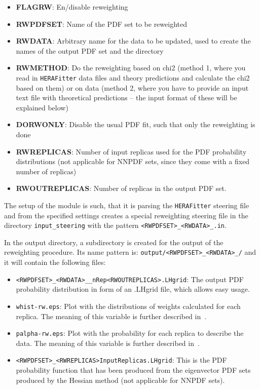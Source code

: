 \documentclass[11pt,a4paper]{article}
\newcommand\fitter{ \mbox{\tt HERAFitter} }
\begin{document}
\begin{itemize}
 \item \textbf{FLAGRW}: En/disable reweighting
 \item \textbf{RWPDFSET}: Name of the PDF set to be reweighted
 \item \textbf{RWDATA}: Arbitrary name for the data to be updated, used to create the names of the output PDF set and the directory
 \item \textbf{RWMETHOD}: Do the reweighting based on chi2 (method 1, where you read in \fitter data files and theory predictions and calculate the chi2 based on them) or on data (method 2, where you have to provide an input text file with theoretical predictions {--} the input format of these will be explained below)
 \item \textbf{DORWONLY}: Disable the usual PDF fit, such that only the reweighting is done 
 \item \textbf{RWREPLICAS}: Number of input replicas used for the PDF probability distributions (not applicable for NNPDF sets, since they come with a fixed number of replicas)
 \item \textbf{RWOUTREPLICAS}: Number of replicas in the output PDF set.
\end{itemize}

The setup of the module is such, that it is parsing the \fitter steering file and from the specified settings creates a special reweighting steering file in the directory {\tt input\_steering} with the pattern {\tt <RWPDFSET>\_<RWDATA>\_<RWMETHOD: chi2 or data>.in}. 

In the output directory, a subdirectory is created for the output of the reweighting procedure. Its name pattern is: {\tt output/<RWPDFSET>\_<RWDATA>\_<RWMETHOD: chi2 or data>/} and it will contain the following files:

\begin{itemize}
 \item {\tt <RWPDFSET>\_<RWDATA>\_<RWMETHOD: chi2 or data>\_nRep<RWOUTREPLICAS>.LHgrid}: The output PDF probability distribution in form of an .LHgrid file, which allows easy usage.
 \item {\tt whist-rw.eps}: Plot with the distributions of weights calculated for each replica. The meaning of this variable is further described in~\cite{Ball:2011gg,Ball:2010gb}.
 \item {\tt palpha-rw.eps}: Plot with the probability for each replica to describe the data. The meaning of this variable is further described in~\cite{Ball:2011gg,Ball:2010gb}.
 \item {\tt <RWPDFSET>\_<RWREPLICAS>InputReplicas.LHgrid}: This is the PDF probability function that has been produced from the eigenvector PDF sets produced by the Hessian method (not applicable for NNPDF sets).
\end{itemize}
\end{document}
